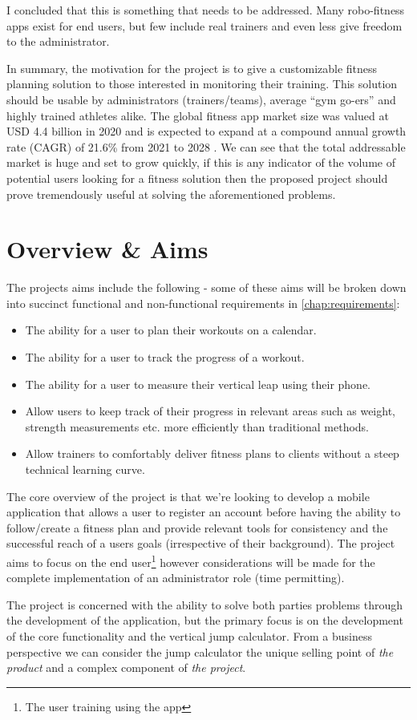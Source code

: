 I concluded that this is something that needs to be addressed. Many robo-fitness apps
exist for end users, but few include real trainers and even less give
freedom to the administrator.
\par
In summary, the motivation for the project is to give a customizable fitness planning
solution to those interested in monitoring their training. This solution should be
usable by administrators (trainers/teams), average ``gym go-ers'' and
highly trained athletes alike. The global fitness app market size
was valued at USD 4.4 billion in 2020 and is expected to expand at a
compound annual growth rate (CAGR) of 21.6\% from 2021 to 2028 \cite{fitness-app-market-size}.
We can see that the total addressable market is huge and set to grow quickly,
if this is any indicator of the volume of potential users looking for a fitness solution then the proposed
project should prove tremendously useful at solving the aforementioned problems.
\pagebreak

\section{Overview \& Aims}
\label{sec:intro_overview}
The projects aims include the following - some of these aims will be broken down into
succinct functional and non-functional requirements in \cref{chap:requirements}:
\begin{itemize}
	\item The ability for a user to plan their workouts on a calendar.
	\item The ability for a user to track the progress of a workout.
	\item The ability for a user to measure their vertical leap using their phone.
	\item Allow users to keep track of their progress in relevant areas
	      such as weight, strength measurements etc. more efficiently than traditional methods.
	\item Allow trainers to comfortably deliver fitness plans to
	      clients without a steep technical learning curve.
\end{itemize}
The core overview of the project is that we're looking to develop a mobile application that
allows a user to register an account before having the ability to follow/create a fitness plan
and provide relevant tools for consistency and the successful reach of a users goals
(irrespective of their background). The project aims to focus on the 
end user\footnote{The user training using the app} however considerations will be made for 
the complete implementation of an administrator role (time permitting).
\par
The project is concerned with the ability to solve both parties problems through the development
of the application, but the primary focus is on the development of the core functionality
and the vertical jump calculator. From a business perspective we can consider the jump calculator
the unique selling point of \textit{the product} and
a complex component of \textit{the project}.

